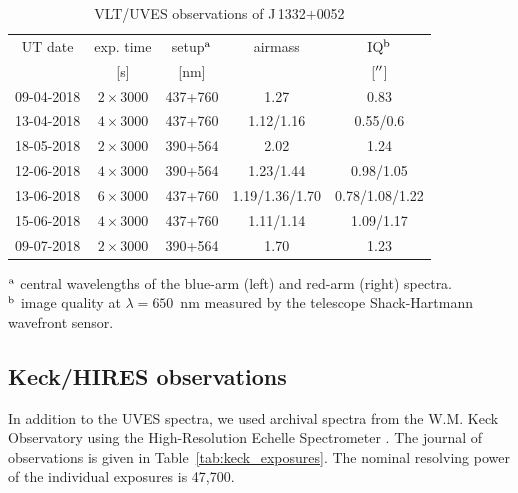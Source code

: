 \documentclass[fleqn,usenatbib]{mnras}
\newcommand{\q}{J\,1332$+$0052}
\begin{document}
\begin{table}
\centering
\caption{VLT/UVES observations of \q}
\label{tab:uves_exposures}
\begin{tabular}{ccccc} %
\hline
UT date    & exp. time       & setup$^{\rm a}$ & airmass        & IQ$^{\rm b}$ \\
           & [s]             & [nm]            &                & [$\hbox{$^{\prime\prime}$}$]           \\
\hline
09-04-2018 & $2 \times 3000$ & 437+760         & 1.27           & 0.83                 \\
13-04-2018 & $4 \times 3000$ & 437+760         & 1.12/1.16      & 0.55/0.6             \\
18-05-2018 & $2 \times 3000$ & 390+564         & 2.02           & 1.24                  \\
12-06-2018 & $4 \times 3000$ & 390+564         & 1.23/1.44      & 0.98/1.05             \\
13-06-2018 & $6 \times 3000$ & 437+760         & 1.19/1.36/1.70 & 0.78/1.08/1.22        \\
15-06-2018 & $4 \times 3000$ & 437+760         & 1.11/1.14      & 1.09/1.17             \\
09-07-2018 & $2 \times 3000$ & 390+564         & 1.70           & 1.23                  \\
\hline
\end{tabular}
\flushleft $^{\rm a}$ central wavelengths of the blue-arm (left) and red-arm (right) spectra.\\
$^{\rm b}$ image quality at $\lambda=650$~nm measured by the telescope Shack-Hartmann wavefront sensor.
\end{table}

\subsection{Keck/HIRES observations}

In addition to the UVES spectra, we used archival spectra from the W.M. Keck Observatory using the High-Resolution Echelle Spectrometer \citep[HIRES;][]{Vogt1994}. The journal of observations is given in Table~\ref{tab:keck_exposures}. The nominal resolving power of the individual exposures is 47,700.
\end{document}
